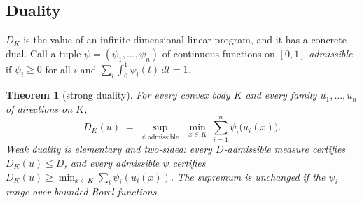 \documentclass[11pt,reqno]{amsart}
\theoremstyle{plain}
\newtheorem{theorem}{Theorem}[section]
\theoremstyle{definition}
\theoremstyle{remark}
\begin{document}
\subsection*{Duality}
$D_K$ is the value of an infinite-dimensional linear program, and it has a
concrete dual. Call a tuple $\psi=(\psi_1,\dots,\psi_n)$ of continuous
functions on $[0,1]$ \emph{admissible} if $\psi_i\ge0$ for all $i$ and
$\sum_i\int_0^1\psi_i(t)\,dt=1$.

\begin{theorem}[strong duality]\label{thm:duality}
For every convex body $K$ and every family $u_1,\dots,u_n$ of directions on
$K$,
\[
D_K(u)\;=\;\sup_{\psi\ \mathrm{admissible}}\ \ \min_{x\in K}\
\sum_{i=1}^n\psi_i\bigl(u_i(x)\bigr).
\]
Weak duality is elementary and two-sided: every $D$-admissible measure
certifies $D_K(u)\le D$, and every admissible $\psi$ certifies
$D_K(u)\ge\min_{x\in K}\sum_i\psi_i(u_i(x))$. The supremum is unchanged if the
$\psi_i$ range over bounded Borel functions.
\end{theorem}
\end{document}
